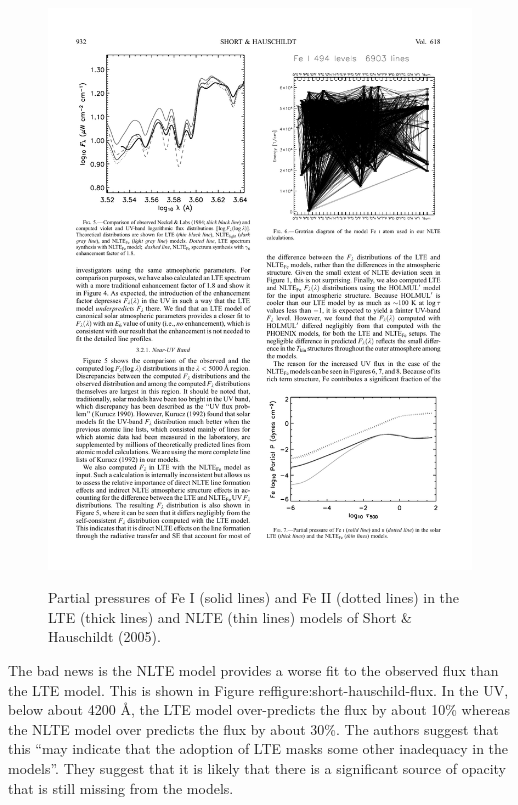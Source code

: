 \begin{figure}
\includegraphics[width=\linewidth]{figures/short-hauschild-pressure.pdf}
\label{figure:short-hauschild-pressure}
\caption{Partial pressures of Fe I (solid lines) and Fe II (dotted lines) in the LTE (thick lines) and NLTE (thin lines) models of Short \& Hauschildt (2005).}
\end{figure}

The bad news is the NLTE model provides a worse fit to the observed flux than the LTE model. This is shown in Figure ref{figure:short-hauschild-flux}. In the UV, below about 4200 Å, the LTE model over-predicts the flux by about 10\% whereas the NLTE model over predicts the flux by about 30\%. The authors suggest that this “may indicate that the adoption of LTE masks some other inadequacy in the models”. They suggest that it is likely that there is a significant source of opacity that is still missing from the models.

